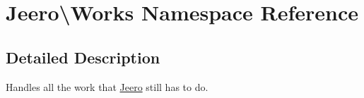 \hypertarget{namespaceJeero_1_1Works}{}\section{Jeero\textbackslash{}Works Namespace Reference}
\label{namespaceJeero_1_1Works}


\subsection{Detailed Description}
Handles all the work that \hyperlink{namespaceJeero}{Jeero} still has to do. 